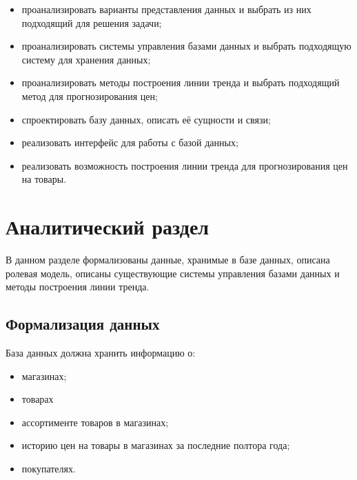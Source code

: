 \documentclass[a4paper,14pt]{extreport}
\begin{document}
\begin{itemize}
	\setlength\itemsep{0.01em}
	\item проанализировать варианты представления данных и выбрать из них подходящий для решения задачи;
	\item проанализировать системы управления базами данных и выбрать подходящую систему для хранения данных;
	\item проанализировать методы построения линии тренда и выбрать подходящий метод для прогнозирования цен;
	\item спроектировать базу данных, описать её сущности и связи;
	\item реализовать интерфейс для работы с базой данных;
	\item реализовать возможность построения линии тренда для прогнозирования цен на товары.
\end{itemize}
	
\chapter{Аналитический раздел}

В данном разделе формализованы данные, хранимые в базе данных, описана ролевая модель, описаны существующие системы управления базами данных и методы построения линии тренда.

\section{Формализация данных}

База данных должна хранить информацию о:

\begin{itemize}
	\setlength\itemsep{0.01em}
	\item магазинах;
	\item товарах
	\item ассортименте товаров в магазинах;
	\item историю цен на товары в магазинах за последние полтора года;
	\item покупателях.
\end{itemize}
\end{document}
